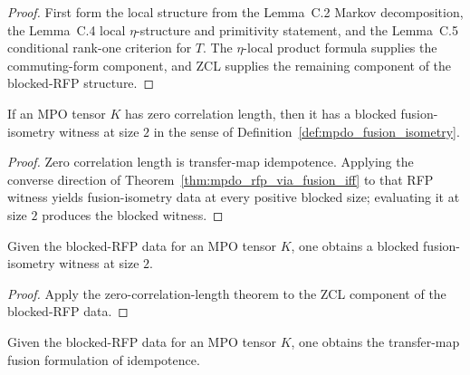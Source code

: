 \begin{proof}\leanok
    First form the local structure from the Lemma~C.2 Markov decomposition,
    the Lemma~C.4 local $\eta$-structure and primitivity statement, and the
    Lemma~C.5 conditional rank-one criterion for $T$. The $\eta$-local product
    formula supplies the commuting-form component, and ZCL supplies the
    remaining component of the blocked-RFP structure.
\end{proof}

\begin{theorem}
    \label{thm:structural_implies_rfp_blocked}
    \leanok
    If an MPO tensor $K$ has zero correlation length, then it has a blocked
    fusion-isometry witness at size $2$ in the sense of
    Definition~\ref{def:mpdo_fusion_isometry}.
\end{theorem}

\begin{proof}\leanok
    Zero correlation length is transfer-map idempotence.
    Applying the converse direction of
    Theorem~\ref{thm:mpdo_rfp_via_fusion_iff} to that RFP witness yields
    fusion-isometry data at every positive blocked size; evaluating it at size $2$
    produces the blocked witness.
\end{proof}

\begin{theorem}
    \label{thm:structural_implies_rfp_blocked_of_data}
    \leanok
    Given the blocked-RFP data for an MPO tensor $K$, one obtains a blocked
    fusion-isometry witness at size $2$.
\end{theorem}

\begin{proof}\leanok
    Apply the zero-correlation-length theorem to the ZCL component of the
    blocked-RFP data.
\end{proof}

\begin{lemma}
    \label{lem:simple_mpdo_blocked_rfp_data_rfp_via_fusion}
    \leanok
    Given the blocked-RFP data for an MPO tensor $K$, one obtains the
    transfer-map fusion formulation of idempotence.
\end{lemma}

